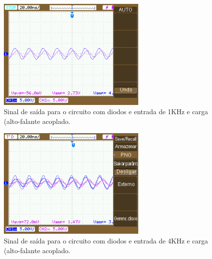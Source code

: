     \begin{figure}[h!]
        \centering
        \includegraphics[height=5.5cm]{imgSource/oscilloscope/NewFile10.png}
        \caption{Sinal de saída para o circuito com diodos e entrada de 1KHz e carga (alto-falante acoplado.}
        \label{fig:newFile10}
    \end{figure}
    
    \begin{figure}[h!]
        \centering
        \includegraphics[height=5.5cm]{imgSource/oscilloscope/NewFile11.png}
        \caption{Sinal de saída para o circuito com diodos e entrada de 4KHz e carga (alto-falante acoplado.}
        \label{fig:newFile11}
    \end{figure}